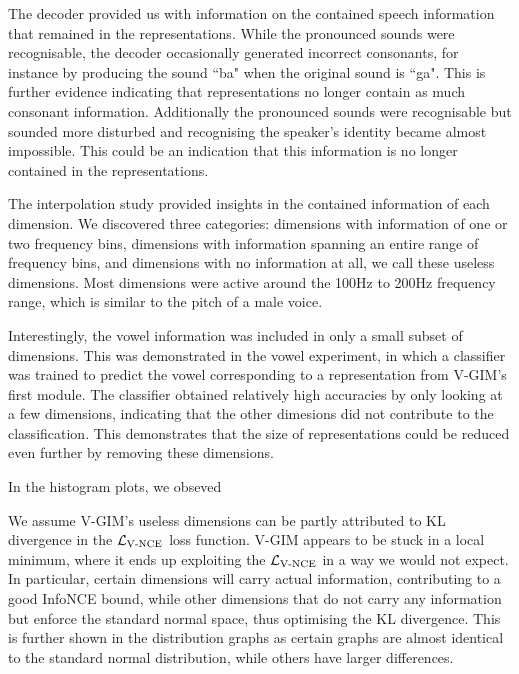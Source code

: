 		
	The decoder provided us with information on the contained speech information that remained in the representations. While the pronounced sounds were recognisable, the decoder occasionally generated incorrect consonants, for instance by producing the sound ``ba" when the original sound is ``ga". This is further evidence indicating that representations no longer contain as much consonant information. Additionally the pronounced sounds were recognisable but sounded more disturbed and recognising the speaker's identity became almost impossible. This could be an indication that this information is no longer contained in the representations.
	

	The interpolation study provided insights in the contained information of each dimension. We discovered three categories: dimensions with information of one or two frequency bins, dimensions with information spanning an entire range of frequency bins, and dimensions with no information at all, we call these useless dimensions. Most dimensions were active around the 100Hz to 200Hz frequency range, which is similar to the pitch of a male voice.

	Interestingly, the vowel information was included in only a small subset of dimensions. This was demonstrated in the vowel experiment, in which a classifier was trained to predict the vowel corresponding to a representation from V-GIM's first module. The classifier obtained relatively high accuracies by only looking at a few dimensions, indicating that the other dimesions did not contribute to the classification.
	 This demonstrates that the size of representations could be reduced even further by removing these dimensions.
	
	
	
	In the histogram plots, we obseved 
	
	We assume V-GIM's useless dimensions can be partly attributed to KL divergence in the $\mathcal{L}_{\text{V-NCE}}$ loss function. 
	V-GIM appears to be stuck in a local minimum, where it ends up exploiting the $\mathcal{L}_{\text{V-NCE}}$ in a way we would not expect. In particular, certain dimensions will carry actual information, contributing to a good InfoNCE bound, while other dimensions that do not carry any information but enforce the standard normal space, thus optimising the KL divergence. This is further shown in the distribution graphs as certain graphs are almost identical to the standard normal distribution, while others have larger differences.
	
